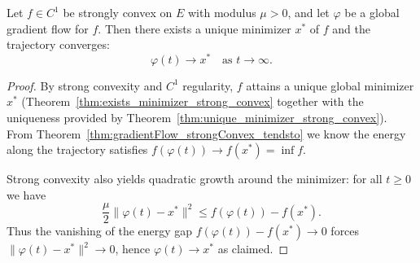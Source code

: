 \begin{theorem}\label{thm:gradientFlow_strongConvex_trajectory_tendsto}
  \leanok{}
  Let $f\in C^1$ be strongly convex on $E$ with modulus $\mu>0$, and let $\varphi$ be
  a global gradient flow for $f$. Then there exists a unique minimizer $x^*$ of $f$ and
  the trajectory converges:
  \[
    \varphi(t) \to x^* \quad\text{as } t\to\infty.
  \]
\end{theorem}
\begin{proof}
  \leanok{}
  By strong convexity and $C^1$ regularity, $f$ attains a unique global minimizer
  $x^*$ (Theorem~\ref{thm:exists_minimizer_strong_convex} together with the uniqueness
  provided by Theorem~\ref{thm:unique_minimizer_strong_convex}). From
  Theorem~\ref{thm:gradientFlow_strongConvex_tendsto} we know the energy along the
  trajectory satisfies $f(\varphi(t))\to f(x^*)=\inf f$.

  Strong convexity also yields quadratic growth around the minimizer: for all $t\ge 0$
  we have
  \[
    \frac{\mu}{2}\|\varphi(t)-x^*\|^2 \le f(\varphi(t)) - f(x^*).
  \]
  Thus the vanishing of the energy gap $f(\varphi(t))-f(x^*)\to 0$ forces
  $\|\varphi(t)-x^*\|^2\to 0$, hence $\varphi(t)\to x^*$ as claimed.
\end{proof}
